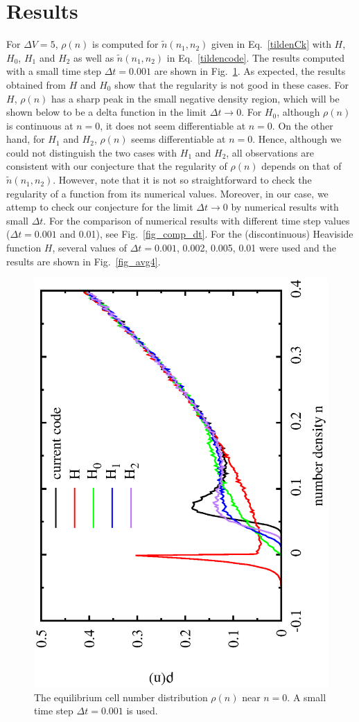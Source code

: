 \documentclass{article}
\begin{document}
\section{Results}

For $\Delta V=5$, $\rho(n)$ is computed for $\tilde{n}(n_1,n_2)$ given in Eq.~\eqref{tildenCk} with $H$, $H_0$, $H_1$ and $H_2$ as well as $\tilde{n}(n_1,n_2)$ in Eq.~\eqref{tildencode}.
The results computed with a small time step $\Delta t=0.001$ are shown in Fig.~\ref{fig_dt0.001}.
As expected, the results obtained from $H$ and $H_0$ show that the regularity is not good in these cases. 
For $H$, $\rho(n)$ has a sharp peak in the small negative density region, which will be shown below to be a delta function in the limit $\Delta t\rightarrow 0$.
For $H_0$, although $\rho(n)$ is continuous at $n=0$, it does not seem differentiable at $n=0$.
On the other hand, for $H_1$ and $H_2$, $\rho(n)$ seems differentiable at $n=0$.
Hence, although we could not distinguish the two cases with $H_1$ and $H_2$, all observations are consistent with our conjecture that the regularity of $\rho(n)$ depends on that of $\tilde{n}(n_1,n_2)$.
However, note that it is not so straightforward to check the regularity of a function from its numerical values.
Moreover, in our case, we attemp to check our conjecture for the limit $\Delta t\rightarrow 0$ by numerical results with small $\Delta t$.
For the comparison of numerical results with different time step values ($\Delta t=0.001$ and 0.01), see Fig.~\ref{fig_comp_dt}.
For the (discontinuous) Heaviside function $H$, several values of $\Delta t =0.001$, 0.002, 0.005, 0.01 were used and the results are shown in Fig.~\ref{fig_avg4}.

\begin{figure}
\centering
\includegraphics[angle=270,width=0.75\linewidth]{fig5/DT0.001.eps}
\caption{\label{fig_dt0.001}The equilibrium cell number distribution $\rho(n)$ near $n=0$. A small time step $\Delta t=0.001$ is used.}
\end{figure}
\end{document}
